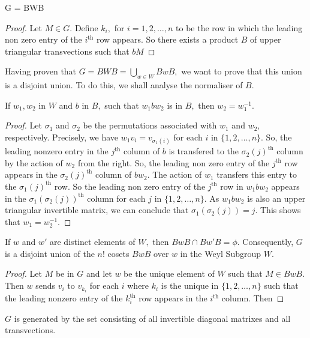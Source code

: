 \begin{theorem}
	G = BWB
\end{theorem}
\begin{proof}
	Let $M \in G.$ Define $k_i,$ for $i = 1,2,\dotsc, n$ to be the row in which the leading non zero entry of the $i^\text{th}$ row appears.
	So there exists a product $B$ of upper triangular transvections such that $bM$
\end{proof}


Having proven that $G = BWB = \bigcup_{w \in W} B w B,$ we want to prove that this union is a disjoint union. To do this, we shall analyse the normaliser of $B.$

\begin{lemma}
	If $w_1, w_2$ in $W$ and $b $ in $B,$ such that $w_1 b w_2$ is
	in $B,$ then $w_2 = w_1^{-1}.$
\end{lemma}
\begin{proof}
Let $\sigma_1$ and $\sigma_2$ be the permutations associated with $w_1$ and $w_2,$ respectively. Precisely, we have
$w_1 v_i = v_{\sigma_1(i)}$ for each $i$ in $\{ 1, 2, \dotsc, n\}.$
So, the leading nonzero entry in the $j^\text{th}$ column of $b$ is 
transfered to the $\sigma_2(j)^\text{th}$ column by the action of $w_2$ from the right.
So, the leading non zero entry of the $j^\text{th}$ row appears in the $\sigma_2(j)^\text{th}$ column of $bw_2.$
The action of $w_1$ transfers this entry to the $\sigma_1(j)^\text{th}$ row.
So the leading non zero entry of the $j^\text{th}$ row in 
$w_1 b w_2$ appears in the $\sigma_1(\sigma_2(j))^\text{th}$ column for each $j$ in 
$\{1, 2, \dotsc, n\}.$
As $w_1 b w_2$ is also an upper triangular invertible matrix, we can conclude that $\sigma_1(\sigma_2(j)) = j.$
This shows that $w_1 = w_2^{-1}.$
\end{proof}

\begin{corollary}
	If $w$ and $w'$ are distinct elements of $W,$ then 
	$B w B \cap B w' B = \phi.$ Consequently, $G$ is a disjoint union of the $n!$ cosets $BwB$ over $w $ in the Weyl Subgroup $W.$
\end{corollary}


\begin{corollary}
\end{corollary}
\begin{proof}
	Let $M$ be in $G$ and let $w$ be the unique element of $W$ such that $M \in BwB.$ Then $w$ sends $v_i$ to $v_{k_i}$ for each $i$ where
	$k_{i}$  is the unique in $\{1, 2 ,\dotsc, n\}$ such that the leading nonzero entry of the $k_i^\text{th}$ row appears in the $i^\text{th}$ column.
	Then 
\end{proof}
\begin{theorem}
	$G$ is generated by the set consisting of all invertible diagonal matrixes and all transvections.
\end{theorem}

